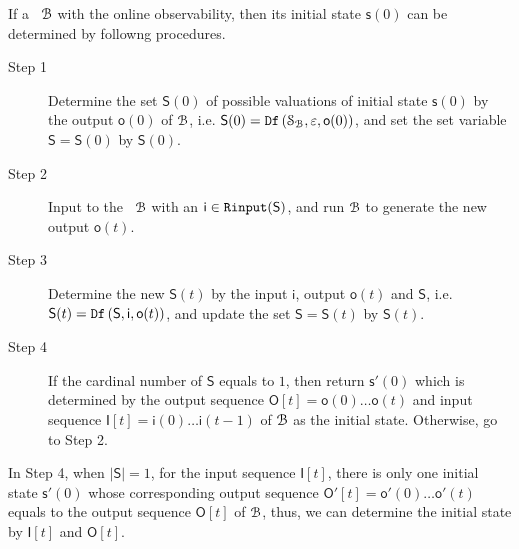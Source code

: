 

 If a \BCN\ ${\mathcal{B}}$ with the online observability, then its initial state $\mathsf{s}(0)$ can be determined by followng procedures.

\begin{description}
	\item[Step 1]  Determine the set $\mathsf{S}(0)$ of possible valuations of initial state $\mathsf{s}(0)$ by the output $\mathsf{o}(0)$ of ${\mathcal{B}}$, i.e. $\mathsf{S}(0)={\tt Df}\left(\mathcal{S}_{\mathcal{B}},\varepsilon,\mathsf{o}(0)\right)$, and set the set variable $\mathsf{S}=\mathsf{S}(0)$ by $\mathsf{S}(0)$.
	\item[Step 2] Input to the \BCN\ ${\mathcal{B}}$ with an $\mathsf{i}\in{\tt Rinput}(\mathsf{S})$, and run ${\mathcal{B}}$ to generate the new output $\mathsf{o}(t)$. 
	\item[Step 3] Determine the new $\mathsf{S}(t)$ by the input $\mathsf{i}$, output $\mathsf{o}(t)$ and $\mathsf{S}$, i.e. $\mathsf{S}(t)={\tt Df}\left(\mathsf{S},\mathsf{i},\mathsf{o}(t)\right)$, and update the set $\mathsf{S}=\mathsf{S}(t)$ by $\mathsf{S}(t)$.
	\item[Step 4] If the cardinal number of $\mathsf{S}$ equals to $1$, then return $\mathsf{s}'(0)$ which is determined by the output sequence $\mathsf{O}[t]=\mathsf{o}(0)\ldots\mathsf{o}(t)$ and input sequence $\mathsf{I}[t]=\mathsf{i}(0)\ldots\mathsf{i}(t-1)$ of ${\mathcal{B}}$ as the initial state. %
	 Otherwise, go to Step 2.
\end{description}
  In Step 4, when $|\mathsf{S}|=1$, for the input sequence $\mathsf{I}[t]$, there is only one initial state $\mathsf{s}'(0)$ whose corresponding output sequence  $\mathsf{O}'[t]=\mathsf{o}'(0)\ldots\mathsf{o}'(t)$ equals to the output sequence $\mathsf{O}[t]$ of ${\mathcal{B}}$, thus, we can determine the initial state by $\mathsf{I}[t]$ and $\mathsf{O}[t]$. 



